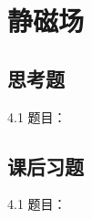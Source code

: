 \chapter{静磁场}

\section{思考题}

\begin{thinking}{4.1}
  题目：\todoanswer

  \begin{solution}
    \todoanswer
  \end{solution}
\end{thinking}

\section{课后习题}

\begin{exercise}{4.1}
  题目：\todoanswer

  \begin{solution}
    \todoanswer
  \end{solution}
\end{exercise}
